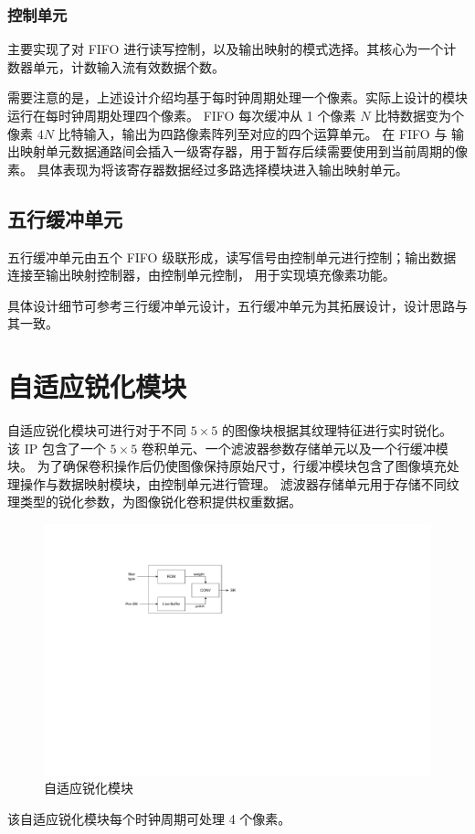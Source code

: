 \documentclass[12pt, a4paper, oneside]{ctexbook}
\begin{document}
	\subsubsection{控制单元}
	主要实现了对 FIFO 进行读写控制，以及输出映射的模式选择。其核心为一个计数器单元，计数输入流有效数据个数。
	\par 需要注意的是，上述设计介绍均基于每时钟周期处理一个像素。实际上设计的模块运行在每时钟周期处理四个像素。
	FIFO 每次缓冲从 1 个像素 $N$ 比特数据变为个像素 $4N$ 比特输入，输出为四路像素阵列至对应的四个运算单元。
	在 FIFO 与 输出映射单元数据通路间会插入一级寄存器，用于暂存后续需要使用到当前周期的像素。
	具体表现为将该寄存器数据经过多路选择模块进入输出映射单元。
	\subsection{五行缓冲单元}
	五行缓冲单元由五个 FIFO 级联形成，读写信号由控制单元进行控制；输出数据连接至输出映射控制器，由控制单元控制，
	用于实现填充像素功能。\par 具体设计细节可参考三行缓冲单元设计，五行缓冲单元为其拓展设计，设计思路与其一致。
	
	\section{自适应锐化模块}
	自适应锐化模块可进行对于不同 $5\times5$ 的图像块根据其纹理特征进行实时锐化。
	该 IP 包含了一个 $5\times5$ 卷积单元、一个滤波器参数存储单元以及一个行缓冲模块。
	为了确保卷积操作后仍使图像保持原始尺寸，行缓冲模块包含了图像填充处理操作与数据映射模块，由控制单元进行管理。
	滤波器存储单元用于存储不同纹理类型的锐化参数，为图像锐化卷积提供权重数据。
		\begin{figure}[h]
		\centering
		\includegraphics[scale=1]{pic/adapt.pdf}
		\caption{自适应锐化模块}
		\end{figure}	
	\par 该自适应锐化模块每个时钟周期可处理 4 个像素。
\end{document}
